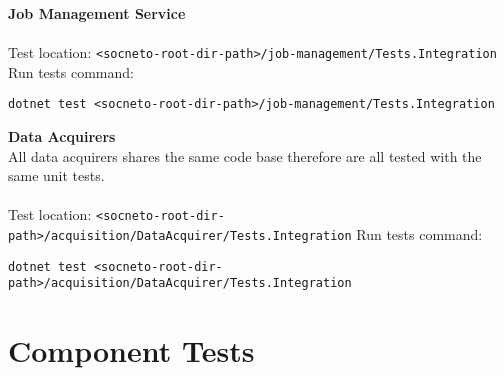 \textbf{Job Management Service}
\\ \\
Test location: \texttt{<socneto-root-dir-path>/job-management/Tests.Integration}\newline
Run tests command: \begin{lstlisting}[style=DOS]
dotnet test <socneto-root-dir-path>/job-management/Tests.Integration
\end{lstlisting}
\vspace{\baselineskip}
\textbf{Data Acquirers} \newline
\\
All data acquirers shares the same code base therefore are all tested with the same unit tests.\\ \\
Test location: \texttt{<socneto-root-dir-path>/acquisition/DataAcquirer/Tests.Inte\-gration}\newline 
Run tests command: 
\begin{lstlisting}[style=DOS]
dotnet test <socneto-root-dir-path>/acquisition/DataAcquirer/Tests.Integration
\end{lstlisting}

\section{Component Tests}

